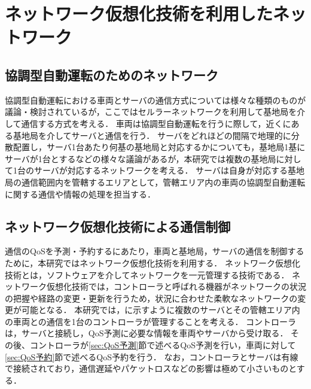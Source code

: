 \documentclass[a4paper,11pt,uplatex]{ujreport}
\begin{document}
\section{ネットワーク仮想化技術を利用したネットワーク}
\label{sec:ネットワーク仮想化技術を利用したネットワーク}

\subsection{協調型自動運転のためのネットワーク}

協調型自動運転における車両とサーバの通信方式については様々な種類のものが議論・検討されているが，ここではセルラーネットワークを利用して基地局を介して通信する方式を考える．
車両は協調型自動運転を行うに際して，近くにある基地局を介してサーバと通信を行う．
サーバをどれほどの間隔で地理的に分散配置し，サーバ1台あたり何基の基地局と対応するかについても，基地局1基にサーバが1台とするなどの様々な議論があるが，本研究では複数の基地局に対して1台のサーバが対応するネットワークを考える．
サーバは自身が対応する基地局の通信範囲内を管轄するエリアとして，管轄エリア内の車両の協調型自動運転に関する通信や情報の処理を担当する．

\subsection{ネットワーク仮想化技術による通信制御}
\label{ネットワーク仮想化技術による通信制御}

通信のQoSを予測・予約するにあたり，車両と基地局，サーバの通信を制御するために，本研究ではネットワーク仮想化技術を利用する．
ネットワーク仮想化技術とは，ソフトウェアを介してネットワークを一元管理する技術である．
ネットワーク仮想化技術では，コントローラと呼ばれる機器がネットワークの状況の把握や経路の変更・更新を行うため，状況に合わせた柔軟なネットワークの変更が可能となる．
本研究では，に示すように複数のサーバとその管轄エリア内の車両との通信を1台のコントローラが管理することを考える．
コントローラは，サーバと接続し，QoS予測に必要な情報を車両やサーバから受け取る．
その後、コントローラが\ref{sec:QoS予測}節で述べるQoS予測を行い，車両に対して\ref{sec:QoS予約}節で述べるQoS予約を行う．
なお，コントローラとサーバは有線で接続されており，通信遅延やパケットロスなどの影響は極めて小さいものとする．\par
\end{document}
